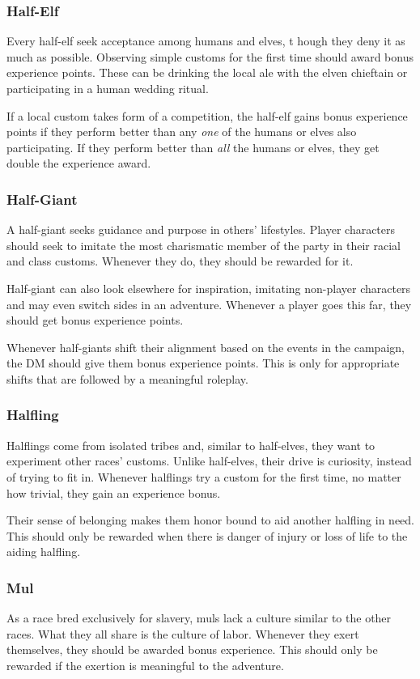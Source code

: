 \subsubsection{Half-Elf}
Every half-elf seek acceptance among humans and elves, t hough they deny it as much as possible. Observing simple customs for the first time should award bonus experience points. These can be drinking the local ale with the elven chieftain or participating in a human wedding ritual.

If a local custom takes form of a competition, the half-elf gains bonus experience points if they perform better than any \emph{one} of the humans or elves also participating. If they perform better than \emph{all} the humans or elves, they get double the experience award.


\subsubsection{Half-Giant}
A half-giant seeks guidance and purpose in others' lifestyles. Player characters should seek to imitate the most charismatic member of the party in their racial and class customs. Whenever they do, they should be rewarded for it.

Half-giant can also look elsewhere for inspiration, imitating non-player characters and may even switch sides in an adventure. Whenever a player goes this far, they should get bonus experience points.

Whenever half-giants shift their alignment based on the events in the campaign, the DM should give them bonus experience points. This is only for appropriate shifts that are followed by a meaningful roleplay.

\subsubsection{Halfling}
Halflings come from isolated tribes and, similar to half-elves, they want to experiment other races' customs. Unlike half-elves, their drive is curiosity, instead of trying to fit in. Whenever halflings try a  custom for the first time, no matter how trivial, they gain an experience bonus.

Their sense of belonging makes them honor bound to aid another halfling in need. This should only be rewarded when there is danger of injury or loss of life to the aiding halfling.

\subsubsection{Mul}
As a race bred exclusively for slavery, muls lack a culture similar to the other races. What they all share is the culture of labor. Whenever they exert themselves, they should be awarded bonus experience. This should only be rewarded if the exertion is meaningful to the adventure.

